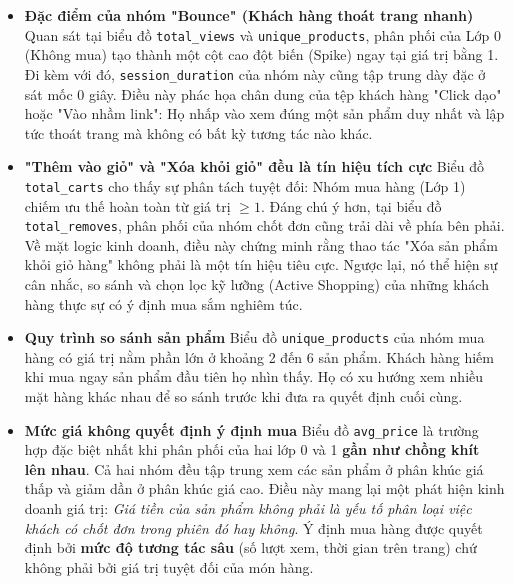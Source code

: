 \documentclass[a4paper,11pt]{article}
\begin{document}
\begin{itemize}[itemsep=6pt, leftmargin=*]
    \item \textbf{Đặc điểm của nhóm "Bounce" (Khách hàng thoát trang nhanh)} 
    Quan sát tại biểu đồ \texttt{total\_views} và \texttt{unique\_products}, phân phối của Lớp 0 (Không mua) tạo thành một cột cao đột biến (Spike) ngay tại giá trị bằng 1. Đi kèm với đó, \texttt{session\_duration} của nhóm này cũng tập trung dày đặc ở sát mốc 0 giây. Điều này phác họa chân dung của tệp khách hàng "Click dạo" hoặc "Vào nhầm link": Họ nhấp vào xem đúng một sản phẩm duy nhất và lập tức thoát trang mà không có bất kỳ tương tác nào khác.
    
    \item \textbf{"Thêm vào giỏ" và "Xóa khỏi giỏ" đều là tín hiệu tích cực}
    Biểu đồ \texttt{total\_carts} cho thấy sự phân tách tuyệt đối: Nhóm mua hàng (Lớp 1) chiếm ưu thế hoàn toàn từ giá trị $\ge 1$. Đáng chú ý hơn, tại biểu đồ \texttt{total\_removes}, phân phối của nhóm chốt đơn cũng trải dài về phía bên phải. Về mặt logic kinh doanh, điều này chứng minh rằng thao tác "Xóa sản phẩm khỏi giỏ hàng" không phải là một tín hiệu tiêu cực. Ngược lại, nó thể hiện sự cân nhắc, so sánh và chọn lọc kỹ lưỡng (Active Shopping) của những khách hàng thực sự có ý định mua sắm nghiêm túc.

    \item \textbf{Quy trình so sánh sản phẩm}
    Biểu đồ \texttt{unique\_products} của nhóm mua hàng có giá trị nằm phần lớn ở khoảng 2 đến 6 sản phẩm. Khách hàng hiếm khi mua ngay sản phẩm đầu tiên họ nhìn thấy. Họ có xu hướng xem nhiều mặt hàng khác nhau để so sánh trước khi đưa ra quyết định cuối cùng.
    
    \item \textbf{Mức giá không quyết định ý định mua}
    Biểu đồ \texttt{avg\_price} là trường hợp đặc biệt nhất khi phân phối của hai lớp 0 và 1 \textbf{gần như chồng khít lên nhau}. Cả hai nhóm đều tập trung xem các sản phẩm ở phân khúc giá thấp và giảm dần ở phân khúc giá cao. Điều này mang lại một phát hiện kinh doanh giá trị: \textit{Giá tiền của sản phẩm không phải là yếu tố phân loại việc khách có chốt đơn trong phiên đó hay không}. Ý định mua hàng được quyết định bởi \textbf{mức độ tương tác sâu} (số lượt xem, thời gian trên trang) chứ không phải bởi giá trị tuyệt đối của món hàng.
\end{itemize}
\end{document}
